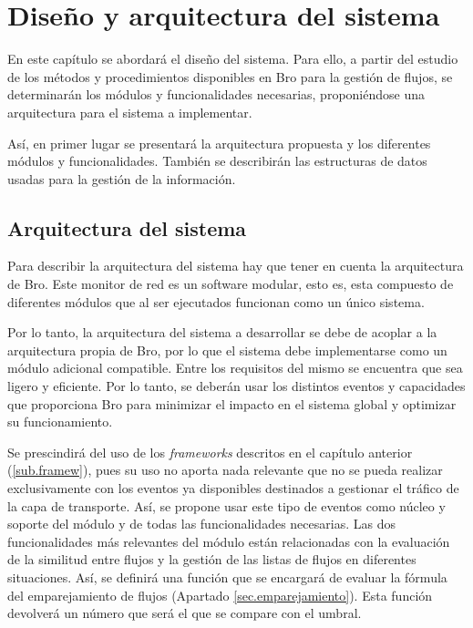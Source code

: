 \chapter{Diseño y arquitectura del sistema}\label{diseno}

En este capítulo se abordará el diseño del sistema. Para ello, a partir del estudio de los métodos y procedimientos disponibles en 
Bro para la gestión de flujos, se determinarán los módulos y funcionalidades necesarias, proponiéndose una arquitectura para el 
sistema a implementar.

\intro Así, en primer lugar se presentará la arquitectura propuesta y los diferentes módulos y funcionalidades. También se describirán 
las estructuras de datos usadas para la gestión de la información.

\section{Arquitectura del sistema}

Para describir la arquitectura del sistema hay que tener en cuenta la arquitectura de Bro. Este monitor de red es un software modular, 
esto es, esta compuesto de diferentes módulos que al ser ejecutados funcionan como un único sistema.

\intro Por lo tanto, la arquitectura del sistema a desarrollar se debe de acoplar a la arquitectura propia de Bro, por lo que el 
sistema debe implementarse como un módulo adicional compatible. Entre los requisitos del mismo se encuentra que sea ligero y 
eficiente. Por lo tanto, se deberán usar los distintos eventos y capacidades que proporciona Bro para minimizar el impacto en el 
sistema global y optimizar su funcionamiento.

\intro Se prescindirá del uso de los \textit{frameworks} descritos en el capítulo anterior (\ref{sub.framew}), pues su uso no aporta 
nada relevante que no se pueda realizar exclusivamente con los eventos ya disponibles destinados a gestionar el tráfico de la capa de 
transporte. Así, se propone usar este tipo de eventos como núcleo y soporte del módulo y de todas las funcionalidades necesarias. Las 
dos funcionalidades más relevantes del módulo están relacionadas con la evaluación de la similitud entre flujos y la gestión de las 
listas de flujos en diferentes situaciones. Así, se definirá una función que se encargará de evaluar la fórmula del emparejamiento de 
flujos (Apartado \ref{sec.emparejamiento}). Esta función devolverá un número que será el que se compare con el umbral.

